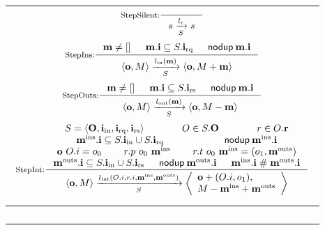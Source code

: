 \begin{figure*}[t]
  \centering
  \begin{tabular}{|c|}
    \hline
    \begin{math}
      \begin{array}{c}
        \inference[StepSilent:]{}{\semstep{S}{s}{\lblEmpty{}}{s}} \\
        \mbox{}\vspace{-5pt} \\ %
        \inference[StepIns:]{\listof{m} \neq \listnil
          & \listof{\idxOf{m}} \subseteq \hsysRqA{S}
          & \nodup{\listof{\idxOf{m}}}}{\semstep{S}
          {\hst{\listof{o}}{M}}
          {\lblIns{\listof{m}}}
          {\hst{\listof{o}}{\enqMsgs{M}{\listof{m}}}}} \\
        \mbox{}\vspace{-5pt} \\ %
        \inference[StepOuts:]{\listof{m} \neq \listnil
          & \listof{\idxOf{m}} \subseteq \hsysRsA{S}
          & \nodup{\listof{\idxOf{m}}}}{\semstep{S}
          {\hst{\listof{o}}{M}}
          {\lblOuts{\listof{m}}}
          {\hst{\listof{o}}{\deqMsgs{M}{\listof{m}}}}} \\
        \mbox{}\vspace{-5pt} \\ %
        \inference[StepInt:]{S = \hsyss{\listof{O}}{i}
          & O \in S.\listof{O}
          & r \in O.\listof{r} \\
          \midxIns{m} \subseteq \hsysInA{S} \cup \hsysRqA{S}
          & \nodup{\midxIns{m}} \\
          \listof{o}\ \idxOf{O} = o_0
          & r.p\ o_0\ \msgIns{m}
          & r.t\ o_0\ \msgIns{m} = (o_1, \msgOuts{m}) \\
          \midxOuts{m} \subseteq \hsysInA{S} \cup \hsysRsA{S}
          & \nodup{\midxOuts{m}}
          & \disj{\midxIns{m}}{\midxOuts{m}}}{\semstep{S}
          {\hst{\listof{o}}{M}}
          {\lblInt{\idxOf{O}}{\idxOf{r}}{\msgIns{m}}{\msgOuts{m}}}
          {\hstm{\mapupd{\listof{o}}{\idxOf{O}}{o_1}}{\enqMsgs{\deqMsgs{M}{\msgIns{m}}}{\msgOuts{m}}}}} \\
        \mbox{}\vspace{-5pt} \\ %
      \end{array}
    \end{math}\\
    \hline
    \begin{math}
      \begin{array}{ccc}

\end{array}
\end{math}
\end{tabular}
\end{figure*}
